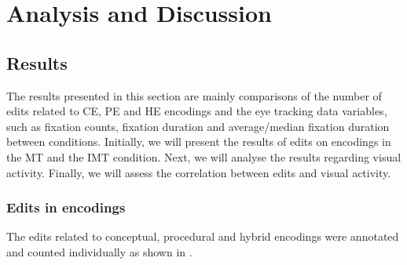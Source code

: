 \documentclass[output=paper]{langsci/langscibook}
\begin{document}
\section{Analysis and Discussion\label{alves:sec:AnalysisAndDiscussion}}

\subsection{Results\label{alves:sec:Results}}

The results presented in this section are mainly comparisons of the number of edits related to CE, PE and HE encodings and the eye tracking data variables, such as fixation counts, fixation duration and average/median fixation duration between conditions. Initially, we will present the results of edits on encodings in the MT and the IMT condition. Next, we will analyse the results regarding visual activity. Finally, we will assess the correlation between edits and visual activity. 

\subsubsection{Edits in encodings\label{alves:sec:EditsInEncodings}}

The edits related to conceptual, procedural and hybrid encodings were annotated and counted individually as shown in .
\end{document}
